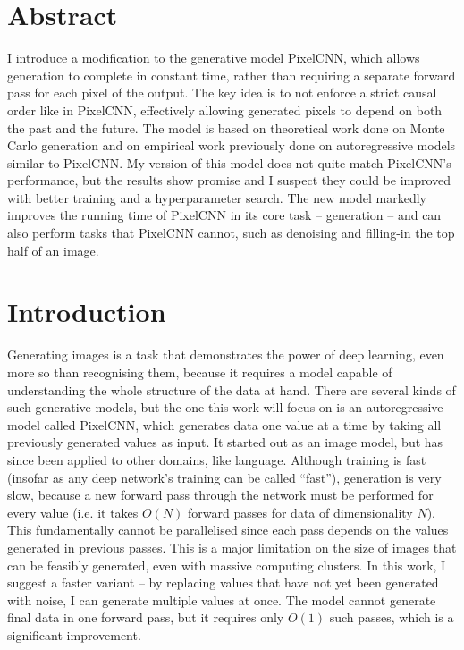\documentclass[11pt, a4paper, openany]{book}
\newcommand{\nquote}[1]{``{#1}''}
\begin{document}
\chapter*{Abstract}
\vspace{-1em}
I introduce a modification to the generative model PixelCNN, which allows generation to complete in constant time, rather than requiring a separate forward pass for each pixel of the output. The key idea is to not enforce a strict causal order like in PixelCNN, effectively allowing generated pixels to depend on both the past and the future. The model is based on theoretical work done on Monte Carlo generation and on empirical work previously done on autoregressive models similar to PixelCNN. My version of this model does not quite match PixelCNN's performance, but the results show promise and I suspect they could be improved with better training and a hyperparameter search. The new model markedly improves the running time of PixelCNN in its core task -- generation -- and can also perform tasks that PixelCNN cannot, such as denoising and filling-in the top half of an image.

\pagestyle{headings}
\tableofcontents
\listoffigures
\listoftables

\mainmatter

\chapter{Introduction}
\label{cha:intro}

Generating images is a task that demonstrates the power of deep learning, even more so than recognising them, because it requires a model capable of understanding the whole structure of the data at hand. There are several kinds of such generative models, but the one this work will focus on is an autoregressive model called PixelCNN, which generates data one value at a time by taking all previously generated values as input. It started out as an image model, but has since been applied to other domains, like language. Although training is fast (insofar as any deep network's training can be called \nquote{fast}), generation is very slow, because a new forward pass through the network must be performed for every value (i.e. it takes $O(N)$ forward passes for data of dimensionality $N$). This fundamentally cannot be parallelised since each pass depends on the values generated in previous passes. This is a major limitation on the size of images that can be feasibly generated, even with massive computing clusters. In this work, I suggest a faster variant -- by replacing values that have not yet been generated with noise, I can generate multiple values at once. The model cannot generate final data in one forward pass, but it requires only $O(1)$ such passes, which is a significant improvement.
\end{document}
